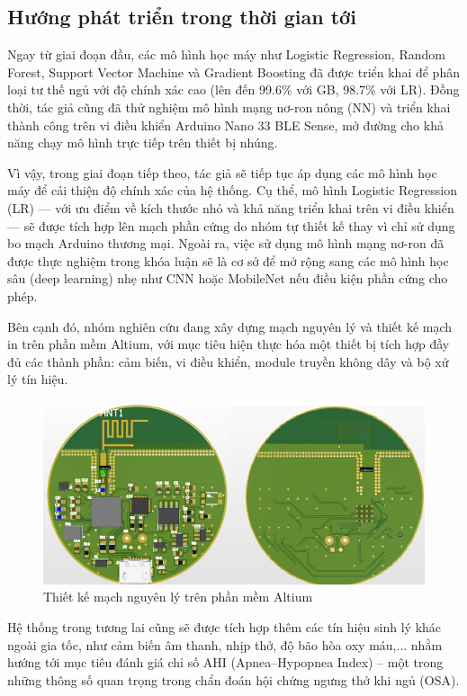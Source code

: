 \subsection*{Hướng phát triển trong thời gian tới}

Ngay từ giai đoạn đầu, các mô hình học máy như Logistic Regression, Random Forest, Support Vector Machine và Gradient Boosting đã được triển khai để phân loại tư thế ngủ với độ chính xác cao (lên đến 99.6\% với GB, 98.7\% với LR). Đồng thời, tác giả cũng đã thử nghiệm mô hình mạng nơ-ron nông (NN) và triển khai thành công trên vi điều khiển Arduino Nano 33 BLE Sense, mở đường cho khả năng chạy mô hình trực tiếp trên thiết bị nhúng.

Vì vậy, trong giai đoạn tiếp theo, tác giả sẽ tiếp tục áp dụng các mô hình học máy để cải thiện độ chính xác của hệ thống. Cụ thể, mô hình Logistic Regression (LR) — với ưu điểm về kích thước nhỏ và khả năng triển khai trên vi điều khiển — sẽ được tích hợp lên mạch phần cứng do nhóm tự thiết kế thay vì chỉ sử dụng bo mạch Arduino thương mại. Ngoài ra, việc sử dụng mô hình mạng nơ-ron đã được thực nghiệm trong khóa luận sẽ là cơ sở để mở rộng sang các mô hình học sâu (deep learning) nhẹ như CNN hoặc MobileNet nếu điều kiện phần cứng cho phép.

Bên cạnh đó, nhóm nghiên cứu đang xây dựng mạch nguyên lý và thiết kế mạch in trên phần mềm Altium, với mục tiêu hiện thực hóa một thiết bị tích hợp đầy đủ các thành phần: cảm biến, vi điều khiển, module truyền không dây và bộ xử lý tín hiệu.

\begin{figure}[htbp]
    \centering
    \includegraphics[width=0.75\linewidth]{images/macjh.png}
    \caption{Thiết kế mạch nguyên lý trên phần mềm Altium}
    \label{macjh}
\end{figure}

Hệ thống trong tương lai cũng sẽ được tích hợp thêm các tín hiệu sinh lý khác ngoài gia tốc, như cảm biến âm thanh, nhịp thở, độ bão hòa oxy máu,... nhằm hướng tới mục tiêu đánh giá chỉ số AHI (Apnea–Hypopnea Index) – một trong những thông số quan trọng trong chẩn đoán hội chứng ngưng thở khi ngủ (OSA).

